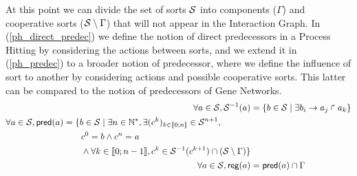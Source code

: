 At this point we can divide the set of sorts $\mathcal{S}$ into components ($\Gamma$) and cooperative sorts
($\mathcal{S} \setminus \Gamma$) that will not appear in the Interaction Graph. In (\ref{ph_direct_predec})
we define the notion of direct predecessors in a Process Hitting by considering the actions between
sorts, and we extend it in (\ref{ph_predec}) to a broader notion of predecessor, where we define the
influence of sort to another by considering actions and possible cooperative sorts. This latter can
be compared to the notion of predecessors of Gene Networks. 
\begin{align}
\forall a \in \mathcal{S}, \mathcal{S}^{-1}(a) &= \{b \in \mathcal{S} \mid \exists b_i\rightarrow a_j\Rsh a_k \}
\label{ph_direct_predec}
\\
\begin{split}
\forall a \in \mathcal{S}, \mathsf{pred}(a) &= \{b \in \mathcal{S} \mid \exists n \in \mathbb{N}^*, \exists (c^k)_{k \in \llbracket 0 ; n \rrbracket} \in \mathcal{S}^{n+1}, \\
                                   & \quad \quad c^0 = b \wedge c^n = a \\
                                   & \quad \quad \wedge \forall k \in \llbracket 0 ; n-1 \rrbracket,
								   c^k \in \mathcal{S}^{-1}(c^{k+1}) \cap (\mathcal{S}\setminus\Gamma)\}
\end{split}
\label{ph_predec}
\\
\forall a\in \mathcal{S}, \mathsf{reg}({a}) & = \mathsf{pred}(a) \cap \Gamma
\label{eq:regulators}
\end{align}

